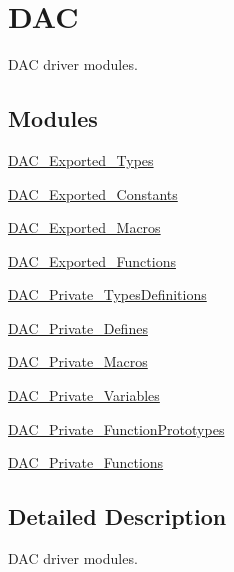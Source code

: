 \hypertarget{group___d_a_c}{}\section{D\+AC}
\label{group___d_a_c}


D\+AC driver modules.  


\subsection*{Modules}
\begin{DoxyCompactItemize}
\item 
\hyperlink{group___d_a_c___exported___types}{D\+A\+C\+\_\+\+Exported\+\_\+\+Types}
\item 
\hyperlink{group___d_a_c___exported___constants}{D\+A\+C\+\_\+\+Exported\+\_\+\+Constants}
\item 
\hyperlink{group___d_a_c___exported___macros}{D\+A\+C\+\_\+\+Exported\+\_\+\+Macros}
\item 
\hyperlink{group___d_a_c___exported___functions}{D\+A\+C\+\_\+\+Exported\+\_\+\+Functions}
\item 
\hyperlink{group___d_a_c___private___types_definitions}{D\+A\+C\+\_\+\+Private\+\_\+\+Types\+Definitions}
\item 
\hyperlink{group___d_a_c___private___defines}{D\+A\+C\+\_\+\+Private\+\_\+\+Defines}
\item 
\hyperlink{group___d_a_c___private___macros}{D\+A\+C\+\_\+\+Private\+\_\+\+Macros}
\item 
\hyperlink{group___d_a_c___private___variables}{D\+A\+C\+\_\+\+Private\+\_\+\+Variables}
\item 
\hyperlink{group___d_a_c___private___function_prototypes}{D\+A\+C\+\_\+\+Private\+\_\+\+Function\+Prototypes}
\item 
\hyperlink{group___d_a_c___private___functions}{D\+A\+C\+\_\+\+Private\+\_\+\+Functions}
\end{DoxyCompactItemize}


\subsection{Detailed Description}
D\+AC driver modules. 

